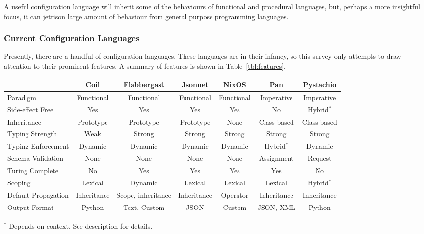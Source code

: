 \documentclass[letterpaper,twocolumn,10pt]{article}
\begin{document}
A useful configuration language will inherit some of the behaviours of functional and procedural languages, but, perhaps a more insightful focus, it can jettison large amount of behaviour from general purpose programming languages.

\subsubsection{Current Configuration Languages}
Presently, there are a handful of configuration languages. These languages are in their infancy, so this survey only attempts to draw attention to their prominent features. A summary of features is shown in Table~\ref{tbl:features}.

\begin{table*}
\caption{\label{tbl:features}Comparison of configuration languages}
\begin{tabular}{lcccccc}
\hline
										& Coil						& Flabbergast					& Jsonnet			& NixOS				& Pan & Pystachio \\\hline
Paradigm						& Functional			& Functional					&	Functional	& Functional	& Imperative			& Imperative \\
Side-effect Free		& Yes							& Yes									&	Yes					& Yes					& No							& Hybrid$^*$ \\
Inheritance					& Prototype				& Prototype						&	Prototype		& None				& Class-based			& Class-based \\
Typing Strength			& Weak						& Strong							&	Strong			& Strong			& Strong					& Strong \\
Typing Enforcement	& Dynamic					& Dynamic							&	Dynamic			& Dynamic			& Hybrid$^*$			& Dynamic \\
Schema Validation		& None						& None								& None				& None				& Assignment			& Request \\
Turing Complete			& No							& Yes									& Yes					& Yes					& Yes							& No \\
Scoping							& Lexical					& Dynamic							& Lexical			& Lexical			& Lexical					& Hybrid$^*$ \\
Default Propagation	& Inheritance			&	Scope, inheritance	& Inheritance	& Operator		& Inheritance			& Inheritance \\
Output Format				& Python					&	Text, Custom				& JSON				& Custom			& JSON, XML				& Python \\
\hline
\end{tabular}
$^*$ Depends on context. See description for details.
\end{table*}
\end{document}
